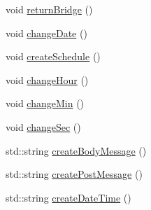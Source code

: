 \begin{DoxyCompactItemize}
void \hyperlink{class_scheduler_control_widget_a3f4447117c1338a01e90c582f2666713}{return\+Bridge} ()
\item 
void \hyperlink{class_scheduler_control_widget_ad6aba10b47fa2f8c57c08bc4171a2a94}{change\+Date} ()
\item 
void \hyperlink{class_scheduler_control_widget_afbf344c96240de973c3f4bdc2f49c23c}{create\+Schedule} ()
\item 
void \hyperlink{class_scheduler_control_widget_ab0d3185086154680e558a7a9eaa978aa}{change\+Hour} ()
\item 
void \hyperlink{class_scheduler_control_widget_a9cdf27c0acc6d8f84c400b1ac8b29995}{change\+Min} ()
\item 
void \hyperlink{class_scheduler_control_widget_a5d24965e21d773cf4013f1af9438b990}{change\+Sec} ()
\item 
std\+::string \hyperlink{class_scheduler_control_widget_a59d6549a621edc590f321292a1946ee2}{create\+Body\+Message} ()
\item 
std\+::string \hyperlink{class_scheduler_control_widget_aa5aa766921972a9d00818deccddfff33}{create\+Post\+Message} ()
\item 
std\+::string \hyperlink{class_scheduler_control_widget_afeebc21f1fc76100e475b6c75bb97034}{create\+Date\+Time} ()
\end{DoxyCompactItemize}
